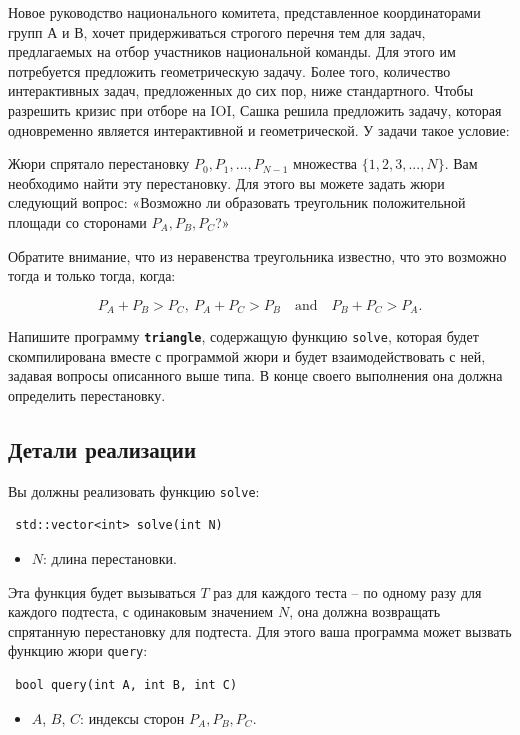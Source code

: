 \documentclass[12pt]{article}
\begin{document}
\renewcommand{\headerLang}{Russian}
\renewcommand{\problemName}{AB23. TRIANGLE}

\renewcommand{\headerLeft}{IATI Day 2, Senior group}
\renewcommand{\headerRightFirst}{XVII INTERNATIONAL ADVANCED TOURNAMENT IN INFORMATICS}
\renewcommand{\headerRightSecond}{ONLINE 2026}

\renewcommand{\tl}{$10$ sec.}
\renewcommand{\ml}{$1024$ MB}
\problem{Problem \problemName}

Новое руководство национального комитета, представленное координаторами групп А и В, хочет придерживаться строгого перечня тем для задач, предлагаемых на отбор участников национальной команды. Для этого им потребуется предложить геометрическую задачу. Более того, количество интерактивных задач, предложенных до сих пор, ниже стандартного. Чтобы разрешить кризис при отборе на IOI, Сашка решила предложить задачу, которая одновременно является интерактивной и геометрической. У задачи такое условие:

Жюри спрятало перестановку $P_0,P_1,...,P_{N-1}$ множества $\{1,2,3,...,N\}$. Вам необходимо найти эту перестановку. Для этого вы можете задать жюри следующий вопрос: «Возможно ли образовать треугольник положительной площади со сторонами $P_A,P_B,P_C$?»

Обратите внимание, что из неравенства треугольника известно, что это возможно тогда и только тогда, когда:

\[P_A + P_B > P_C,\ P_A + P_C > P_B \quad \text{and} \quad P_B + P_C > P_A.\]

Напишите программу \textbf{\texttt{triangle}}, содержащую функцию \texttt{solve}, которая будет скомпилирована вместе с программой жюри и будет взаимодействовать с ней, задавая вопросы описанного выше типа. В конце своего выполнения она должна определить перестановку.

\subsection{Детали реализации}
Вы должны реализовать функцию \texttt{solve}:
\begin{lstlisting}
 std::vector<int> solve(int N)
\end{lstlisting}
\begin{itemize}
	\item $N$: длина перестановки.
\end{itemize}

Эта функция будет вызываться $T$ раз для каждого теста -- по одному разу для каждого подтеста, с одинаковым значением $N$, она должна возвращать спрятанную перестановку для подтеста. Для этого ваша программа может вызвать функцию жюри \texttt{query}:
\begin{lstlisting}
 bool query(int A, int B, int C)
\end{lstlisting}
\begin{itemize}
	\item $A$, $B$, $C$: индексы сторон $P_A, P_B, P_C$.
\end{itemize}
\end{document}
